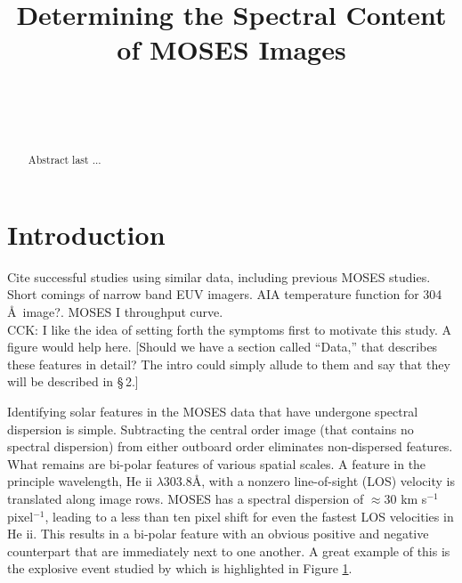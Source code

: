\documentclass[]{solarphysics}
\newcommand{\cck}[1]{{\color{red} CCK: #1}} %
\begin{document}
\begin{article}
\begin{opening}

\title{Determining the Spectral Content of MOSES Images}

\author[addressref={aff1},corref,email={jacob.parker3@montana.edu}]{~}%
\author[addressref=aff1,email={Want to include your email Charles?}]{~}%
\address[id=aff1]{Montana State University}


\begin{abstract}
Abstract last ...
\end{abstract}
\end{opening}

\section{Introduction}

	
	
	Cite successful studies using similar data, including previous MOSES studies. \\ 
	
	Short comings of narrow band EUV imagers.  AIA temperature function for 304 \AA \ image?.  MOSES I throughput curve. \\
	
	 \cck{I like the idea of setting forth the symptoms first to motivate this study. A figure would help here. [Should we have a section called ``Data,'' that describes these features in detail? The intro could simply allude to them and say that they will be described in \S\,2.]}
	
	Identifying solar features in the MOSES data that have undergone spectral dispersion is simple. Subtracting the central order image (that contains no spectral dispersion) from either outboard order eliminates non-dispersed features. What remains are bi-polar features of various spatial scales.  A feature in the principle wavelength, He {\sc ii} $\lambda 303.8$\AA, with a nonzero line-of-sight (LOS) velocity is translated along image rows.    MOSES has a spectral dispersion of $\approx 30$ km s$^{-1}$ pixel$^{-1}$, leading to a less than ten pixel shift for even the fastest LOS velocities in He {\sc ii}. 
	This results in a bi-polar feature with an obvious positive and negative counterpart that are immediately next to one another. A great example of this is the explosive event studied by \citet{Fox2010} which is highlighted in Figure \ref{}.
	

\end{article}
\end{document}
